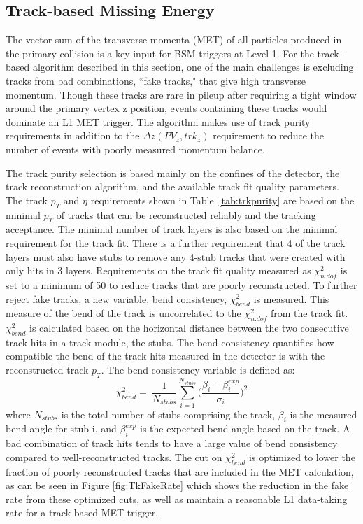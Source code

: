 \subsection{Track-based Missing Energy}
\label{sec:TkMET}

The vector sum of the transverse momenta (MET) of all particles produced in the primary collision is a key input for BSM triggers at Level-1. For the track-based algorithm described in this section, one of the main challenges is excluding tracks from bad combinations, ``fake tracks," that give high transverse momentum. Though these tracks are rare in pileup after requiring a tight window around the primary vertex z position, events containing these tracks would dominate an L1 MET trigger. The algorithm makes use of track purity requirements in addition to the $\Delta z\left(PV_{z}, trk_{z}\right)$ requirement to reduce the number of events with poorly measured momentum balance.

The track purity selection is based mainly on the confines of the detector, the track reconstruction algorithm, and the available track fit quality parameters. The track $p_{T}$ and $\eta$ requirements shown in Table~\ref{tab:trkpurity} are based on the minimal $p_{T}$ of tracks that can be reconstructed reliably and the tracking acceptance. The minimal number of track layers is also based on the minimal requirement for the track fit. There is a further requirement that 4 of the track layers must also have stubs to remove any 4-stub tracks that were created with only hits in 3 layers. Requirements on the track fit quality measured as $\chi^{2}_{n.dof}$ is set to a minimum of 50 to reduce tracks that are poorly reconstructed. To further reject fake tracks, a new variable, bend consistency, $\chi^{2}_{bend}$ is measured. This measure of the bend of the track is uncorrelated to the $\chi^{2}_{n.dof}$ from the track fit. $\chi^{2}_{bend}$ is calculated based on the horizontal distance between the two consecutive track hits in a track module, the stubs. The bend consistency quantifies how compatible the bend of the track hits measured in the detector is with the reconstructed track $p_{T}$. The bend consistency variable is defined as:
\begin{equation}
\chi^{2}_{bend} =~ \frac{1}{N_{stubs}} \sum_{i=1}^{N_{stubs}}\Big(\frac{\beta_i - \beta_i^{exp}}{\sigma_{i}}\Big)^2
\end{equation}
where $N_{stubs}$ is the total number of stubs comprising the track, $\beta_{i}$ is the measured bend angle for stub i, and $\beta_i^{exp}$ is the expected bend angle based on the track. A bad combination of track hits tends to have a large value of bend consistency compared to well-reconstructed tracks. The cut on $\chi^{2}_{bend}$ is optimized to lower the fraction of poorly reconstructed tracks that are included in the MET calculation, as can be seen in Figure \ref{fig:TkFakeRate} which shows the reduction in the fake rate from these optimized cuts, as well as maintain a reasonable L1 data-taking rate for a track-based MET trigger.



